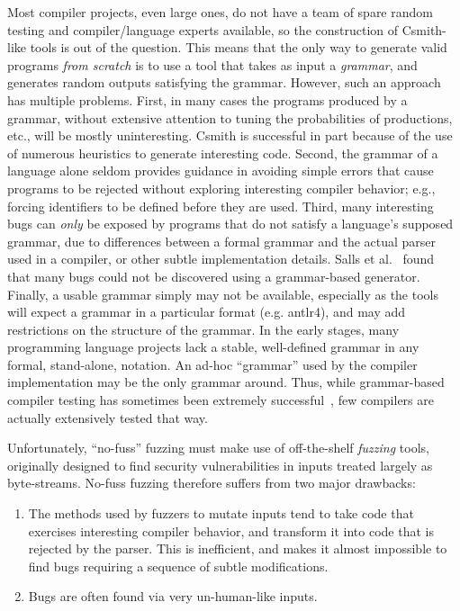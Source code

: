 \begin{sloppypar}
 Most compiler projects, even large ones, do not have a team
of spare random testing and compiler/language experts available, so the construction of
Csmith-like tools is out of the question.  This means that the only
way to generate valid programs \emph{from scratch} is to use a tool that takes as
input a \emph{grammar}, and generates random outputs
satisfying the grammar.   However, such an approach has multiple problems.
First, in many cases the programs produced by a grammar, without
extensive attention to tuning the probabilities of productions, etc., will be mostly uninteresting.
Csmith is successful in part because of the use of numerous heuristics
to generate interesting code.  Second, the grammar of a language alone
seldom provides guidance in avoiding simple errors that cause programs
to be rejected without exploring interesting compiler behavior; e.g., forcing identifiers to be
defined before they are used.  Third, many interesting bugs can \emph{only}
be exposed by programs that do not satisfy a language's supposed grammar, due to differences between a formal grammar and the actual
parser used in a compiler, or other subtle implementation details.
Salls et al.~\cite{Salls2021TokenLevel} found that many bugs could not be discovered using a
grammar-based generator.
Finally, a usable grammar simply may not be available, especially as the
tools will expect a grammar in a particular format (e.g. antlr4), and may add
restrictions on the structure of the grammar.  In the early stages,
many programming language projects lack a stable, well-defined
grammar in any formal, stand-alone, notation.  An ad-hoc ``grammar'' used by the compiler implementation may be the
only grammar around.  Thus, while grammar-based compiler
testing has sometimes been extremely successful~\cite{LangFuzz}, few compilers are actually
extensively tested that way.
\end{sloppypar}

Unfortunately, ``no-fuss''
fuzzing must make use of off-the-shelf \emph{fuzzing} tools,
originally designed to find security vulnerabilities in inputs treated
largely as byte-streams.  No-fuss
fuzzing therefore
suffers from two major drawbacks:

\begin{enumerate}
\item The methods used by fuzzers to mutate inputs tend to take code that exercises interesting
  compiler behavior, and transform it into code that is rejected by
  the parser.  This is inefficient, and makes it
  almost impossible to find bugs requiring a sequence of subtle
  modifications.
  \item Bugs are often
    found via very un-human-like inputs.
  \end{enumerate}

